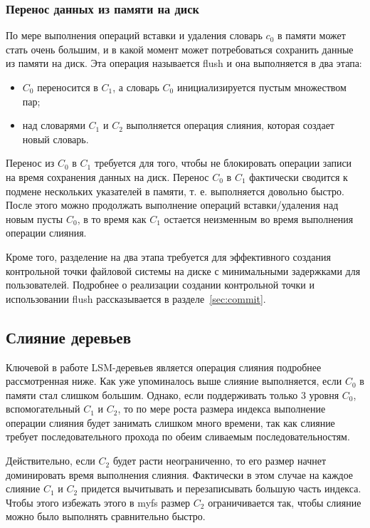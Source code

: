 \subsubsection{Перенос данных из памяти на диск}

По мере выполнения операций вставки и удаления словарь $c_0$ в памяти может
стать очень большим, и в какой момент может потребоваться сохранить данные из
памяти на диск. Эта операция называется flush и она выполняется в два этапа:
\begin{itemize}
  \item $C_0$ переносится в $C_1$, а словарь $C_0$ инициализируется пустым
        множеством пар;
  \item над словарями $C_1$ и $C_2$ выполняется операция слияния, которая
        создает новый словарь.
\end{itemize}

Перенос из $C_0$ в $C_1$ требуется для того, чтобы не блокировать операции
записи на время сохранения данных на диск. Перенос $C_0$ в $C_1$ фактически
сводится к подмене нескольких указателей в памяти, т. е. выполняется довольно
быстро. После этого можно продолжать выполнение операций вставки/удаления над
новым пусты $C_0$, в то время как $C_1$ остается неизменным во время выполнения
операции слияния.

Кроме того, разделение на два этапа требуется для эффективного создания
контрольной точки файловой системы на диске с минимальными задержками для
пользователей. Подробнее о реализации создании контрольной точки и использовании
flush рассказывается в разделе~\ref{sec:commit}.


\subsection{Слияние деревьев}

Ключевой в работе LSM-деревьев является операция слияния подробнее рассмотренная
ниже. Как уже упоминалось выше слияние выполняется, если $C_0$ в памяти стал
слишком большим. Однако, если поддерживать только 3 уровня $C_0$,
вспомогательный $C_1$ и $C_2$, то по мере роста размера индекса выполнение
операции слияния будет занимать слишком много времени, так как слияние требует
последовательного прохода по обеим сливаемым последовательностям.

Действительно, если $C_2$ будет расти неограниченно, то его размер начнет
доминировать время выполнения слияния. Фактически в этом случае на каждое
слияние $C_1$ и $C_2$ придется вычитывать и перезаписывать большую часть
индекса. Чтобы этого избежать этого в myfs размер $C_2$ ограничивается так,
чтобы слияние можно было выполнять сравнительно быстро.


